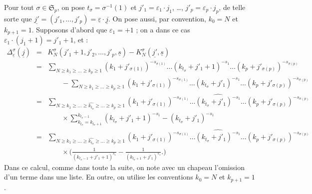 \documentclass[12pt,francais, reqno]{smfart}
\numberwithin{equation}{section}
\newcommand{\spp}{{\mathfrak S}_p}
\newcommand{\eps}{\varepsilon}
\newcommand{\epssoul}{\underline{\eps}}
\newcommand{\jsoul}{\underline{j}}
\newcommand{\jprsoul}{\underline{j'}}
\newcommand{\ssoul}{\underline{s}}
\newcommand{\tsig}{t_{\sigma}}
\newcommand{\desj}{\Delta_{\epssoul} ^\sigma (\jsoul)}
\begin{document}
Pour tout $\sigma \in \spp$, on pose $\tsig= \sigma^{-1}(1)$ et $j'_1 = \eps_1 \cdot j_1$, \ldots,   $j'_p = \eps_p \cdot j_p$, de telle sorte que $\jprsoul = (j'_1,\ldots, j'_p) =\epssoul \cdot \jsoul$. 
On pose aussi, par convention, $k_0 = N$ et $k_{p+1} = 1$. 
Supposons d'abord que $\eps_1 =  + 1$ ; on a dans ce cas $\eps_1 \cdot (j_1+1) = j'_1 + 1$, et : 
\begin{eqnarray*}
\desj 
&=& K_N^\sigma (j'_1+1, j'_2, \ldots,  j'_p, \ssoul) - K_N^\sigma (\jprsoul , \ssoul) \\
&=& \sum_{N \geq k_1 \geq \ldots  \geq k_p  \geq 1} (k_1+j'_{\sigma(1)})^{-s_{\sigma(1)}} \ldots   
 (k_{\tsig}+j'_1+1)^{-s_1} \ldots  (k_p+j'_{\sigma(p)})^{-s_{\sigma(p)}} \\
&& \quad \quad  - \sum_{N \geq k_1 \geq \ldots  \geq k_p  \geq 1} (k_1+j'_{\sigma(1)})^{-s_{\sigma(1)}} \ldots   
 (k_{\tsig}+j'_1)^{-s_1} \ldots  (k_p+j'_{\sigma(p)})^{-s_{\sigma(p)}} \\
&=&  \sum_{N \geq k_1 \geq \ldots \geq \widehat{k_{\tsig}} \geq \ldots  \geq k_p  \geq 1} 
(k_1+j'_{\sigma(1)})^{-s_{\sigma(1)}} \ldots   \widehat{ (k_{\tsig}+j'_1)^{-s_1} } \ldots  (k_p+j'_{\sigma(p)})^{-s_{\sigma(p)}} \\
&& \quad \quad \times  \sum_{k_{\tsig} = k_{\tsig+1}} ^{k_{\tsig-1}}  (k_{\tsig}+j'_1+1)^{-s_1} 
- (k_{\tsig}+j'_1)^{-s_1} \\
&=&  \sum_{N \geq k_1 \geq \ldots \geq  \widehat{k_{\tsig}} \geq \ldots  \geq k_p  \geq 1} 
(k_1+j'_{\sigma(1)})^{-s_{\sigma(1)}} \ldots   \widehat{ (k_{\tsig}+j'_1)^{-s_1} } \ldots  (k_p+j'_{\sigma(p)})^{-s_{\sigma(p)}} \\
&& \quad \quad \times  \Big( \frac{1}{ (k_{\tsig-1}+j'_1+1)^{s_1}} -  \frac{1}{ (k_{\tsig+1}+j'_1)^{s_1}} . 
\Big)
\end{eqnarray*}
Dans ce calcul, comme dans toute la suite, on note avec un chapeau l'omission d'un terme dans une liste. En outre, on utilise les conventions $k_0 = N$ et $k_{p+1} = 1$. 
\end{document}
